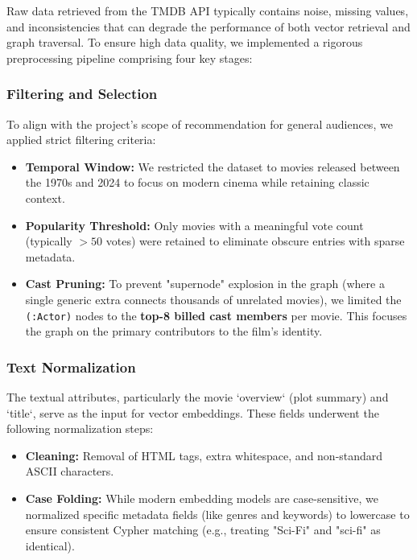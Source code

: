 \documentclass[a4paper, 12pt]{extreport}
\begin{document}
Raw data retrieved from the TMDB API typically contains noise, missing values, and inconsistencies that can degrade the performance of both vector retrieval and graph traversal. To ensure high data quality, we implemented a rigorous preprocessing pipeline comprising four key stages:

\subsubsection{Filtering and Selection}
To align with the project's scope of recommendation for general audiences, we applied strict filtering criteria:
\begin{itemize}
    \item[] \textbf{Temporal Window:} We restricted the dataset to movies released between the 1970s and 2024 to focus on modern cinema while retaining classic context.
    \item[] \textbf{Popularity Threshold:} Only movies with a meaningful vote count (typically $>50$ votes) were retained to eliminate obscure entries with sparse metadata.
    \item[] \textbf{Cast Pruning:} To prevent "supernode" explosion in the graph (where a single generic extra connects thousands of unrelated movies), we limited the \texttt{(:Actor)} nodes to the \textbf{top-8 billed cast members} per movie. This focuses the graph on the primary contributors to the film's identity.
\end{itemize}

\subsubsection{Text Normalization}
The textual attributes, particularly the movie `overview` (plot summary) and `title`, serve as the input for vector embeddings. These fields underwent the following normalization steps:
\begin{itemize}
    \item \textbf{Cleaning:} Removal of HTML tags, extra whitespace, and non-standard ASCII characters.
    \item \textbf{Case Folding:} While modern embedding models are case-sensitive, we normalized specific metadata fields (like genres and keywords) to lowercase to ensure consistent Cypher matching (e.g., treating "Sci-Fi" and "sci-fi" as identical).
\end{itemize}
\end{document}
